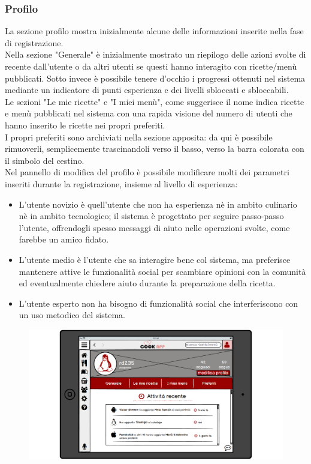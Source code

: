 \subsubsection{Profilo}
La sezione profilo mostra inizialmente alcune delle informazioni inserite nella fase di registrazione.\\
Nella sezione "Generale" è inizialmente mostrato un riepilogo delle azioni svolte di recente dall'utente o da altri utenti se questi hanno interagito con ricette/menù pubblicati. Sotto invece è possibile tenere d'occhio i progressi ottenuti nel sistema mediante un indicatore di punti esperienza e dei livelli sbloccati e sbloccabili.\\
Le sezioni "Le mie ricette" e "I miei menù", come suggerisce il nome indica ricette e menù pubblicati nel sistema con una rapida visione del numero di utenti che hanno inserito le ricette nei propri preferiti.\\
I propri preferiti sono archiviati nella sezione apposita: da qui è possibile rimuoverli, semplicemente trascinandoli verso il basso, verso la barra colorata con il simbolo del cestino.\\
Nel pannello di modifica del profilo è possibile modificare molti dei parametri inseriti durante la registrazione, insieme al livello di esperienza:
\begin{itemize}
\item L'utente novizio è quell'utente che non ha esperienza nè in ambito culinario nè in ambito tecnologico; il sistema è progettato per seguire passo-passo l'utente, offrendogli spesso messaggi di aiuto nelle operazioni svolte, come farebbe un amico fidato.
\item L'utente medio è l'utente che sa interagire bene col sistema, ma preferisce mantenere attive le funzionalità social per scambiare opinioni con la comunità ed eventualmente chiedere aiuto durante la preparazione della ricetta.
\item L'utente esperto non ha bisogno di funzionalità social che interferiscono con un uso metodico del sistema. 
\end{itemize}
\begin{figure}[H]
	\centering
	\includegraphics[width=0.95\linewidth]{img/mockup/Profilo-generale.png}
\end{figure}
